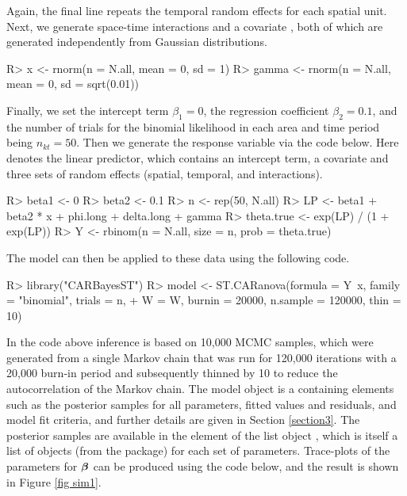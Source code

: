 \documentclass[article, nojss]{jss}
\newcommand{\bd}[1]{\ensuremath{\mbox{\boldmath $#1$}}}
\begin{document}
Again, the final line repeats the temporal random effects for each spatial unit. Next, we generate space-time interactions and a covariate , both of which are generated independently from Gaussian distributions.

\begin{Schunk}
\begin{Sinput}
R>  x <- rnorm(n = N.all, mean = 0, sd = 1)
R>  gamma <- rnorm(n = N.all, mean = 0, sd = sqrt(0.01))
\end{Sinput}
\end{Schunk}

Finally, we set the intercept term $\beta_1=0$, the regression coefficient $\beta_2=0.1$, and the number of trials for the binomial likelihood in each area and time period being $n_{kt}=50$. Then we generate the response variable via the code below. Here  denotes the linear predictor, which contains an intercept term, a covariate and three sets of random effects (spatial, temporal, and interactions).

\begin{Schunk}
\begin{Sinput}
R>  beta1 <- 0
R>  beta2 <- 0.1
R>  n <- rep(50, N.all)
R>  LP <- beta1 + beta2 * x + phi.long + delta.long + gamma
R>  theta.true <- exp(LP) / (1 + exp(LP))
R>  Y <- rbinom(n = N.all, size = n, prob = theta.true)
\end{Sinput}
\end{Schunk}


The  model can then be applied to these data using the following code.


\begin{CodeInput}
R>  library("CARBayesST")
R>  model <- ST.CARanova(formula = Y~x, family = "binomial", trials = n,  
+       W = W, burnin = 20000, n.sample = 120000, thin = 10)
\end{CodeInput}

In the code above inference is based on 10,000 MCMC samples, which were generated from a single Markov chain that was run for 120,000 iterations with a 20,000 burn-in period and subsequently thinned by 10 to reduce the autocorrelation of the Markov chain. The model object is a  containing elements such as the posterior samples for all parameters, fitted values and residuals, and model fit criteria, and further details are given in Section \ref{section3}. The posterior samples are available in the  element of the list object , which is itself a list of  objects (from the  package) for each set of parameters. Trace-plots of the parameters for $\bd{\beta}$ can be produced using the code below, and the result is shown in Figure \ref{fig sim1}.
\end{document}
